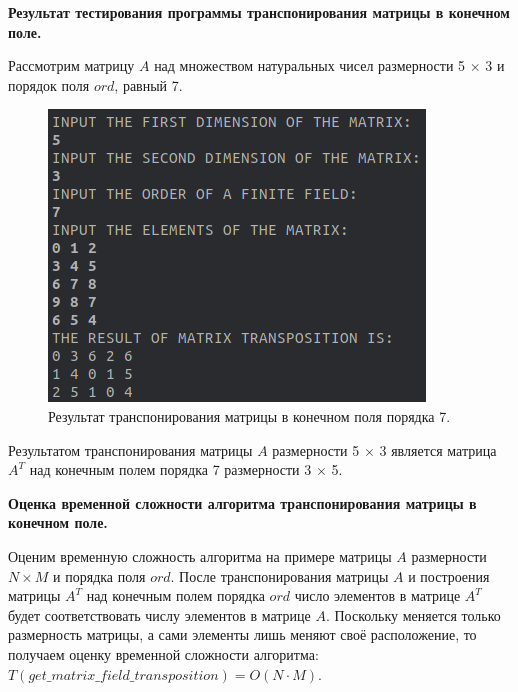 \documentclass[spec, och, otchet, hidelinks]{SCWorks}
\newcommand{\tbf}[1]{\textbf{#1}}
\begin{document}
\newpage

\par \tbf{Результат тестирования программы транспонирования матрицы в конечном
  поле.}
\par Рассмотрим матрицу $A$ над множеством натуральных чисел размерности 5
$\times$ 3 и порядок поля $ord$, равный 7.

\begin{figure}[h]
  \center\includegraphics[scale=0.6]{matrix_field_transposition.png}
  \caption{Результат транспонирования матрицы в конечном поля порядка 7.}
\end{figure}

\par Результатом транспонирования матрицы $A$ размерности 5 $\times$ 3 является
матрица $A^{T}$ над конечным полем порядка 7 размерности 3 $\times$ 5. \\

\par \tbf{Оценка временной сложности алгоритма транспонирования матрицы в
  конечном поле.}
\par Оценим временную сложность алгоритма на примере матрицы $A$ размерности $N
\times M$ и порядка поля $ord$. После транспонирования матрицы $A$ и построения
матрицы $A^{T}$ над конечным полем порядка $ord$ число элементов в матрице $A^T$
будет соответствовать числу элементов в матрице $A$. Поскольку меняется только
размерность матрицы, а сами элементы лишь меняют своё расположение, то получаем
оценку временной сложности алгоритма: $T(get\_matrix\_field\_transposition) = O(N
\cdot M)$.

\newpage
\end{document}
